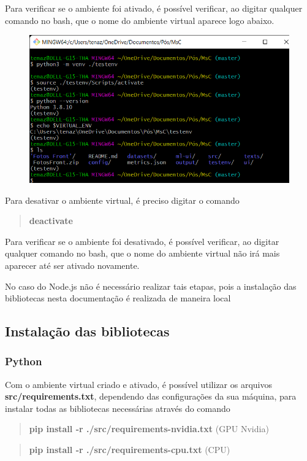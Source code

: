 \documentclass[portugues]{ic-tese}
\begin{document}
Para verificar se o ambiente foi ativado, é possível verificar, ao digitar qualquer comando no bash, que o nome do ambiente virtual aparece logo abaixo.

\begin{figure}[h!]
\centering
\includegraphics[scale=0.4]{images/doc-install/virtualenv-check.png}
\label{fig:DocInstallVirtualEnvCheck}
\end{figure}

Para desativar o ambiente virtual, é preciso digitar o comando

\begin{quote}\textbf{deactivate}\end{quote}

Para verificar se o ambiente foi desativado, é possível verificar, ao digitar qualquer comando no bash, que o nome do ambiente virtual não irá mais aparecer até ser ativado novamente.

No caso do Node.js não é necessário realizar tais etapas, pois a instalação das bibliotecas nesta documentação é realizada de maneira local

\subsection{Instalação das bibliotecas}

\subsubsection{Python}

Com o ambiente virtual criado e ativado, é possível utilizar os arquivos \textbf{src/requirements.txt}, dependendo das configurações da sua máquina, para instalar todas as bibliotecas necessárias através do comando

\begin{quote}\textbf{pip install -r ./src/requirements-nvidia.txt} (GPU Nvidia)\end{quote}
\begin{quote}\textbf{pip install -r ./src/requirements-cpu.txt} (CPU)\end{quote}
\end{document}
